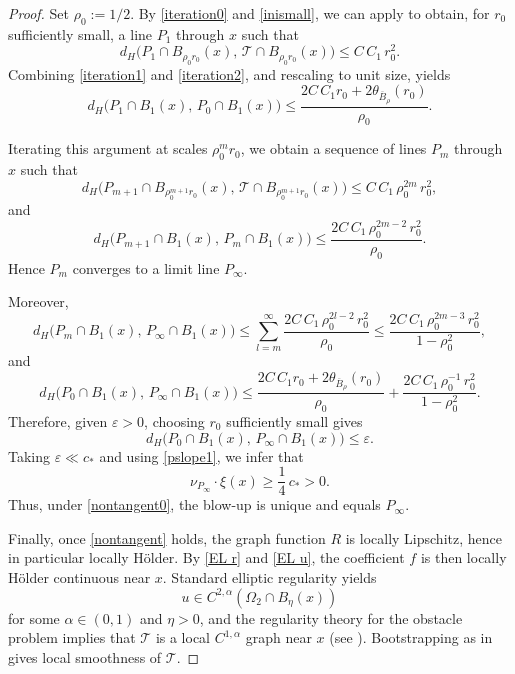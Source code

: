\documentclass[reqno,11pt]{amsart}
\numberwithin{equation}{section}
\theoremstyle{remark}
\begin{document}
\begin{proof}
Set $\rho_0:=1/2$.
By \eqref{iteration0} and \eqref{inismall}, we can apply \cite[Theorem~7.1]{B2001} to obtain,
for $r_0$ sufficiently small, a line $P_1$ through $x$ such that
\begin{equation}\label{iteration2}
d_H\bigl(P_1\cap B_{\rho_0 r_0}(x),\,\mathcal T\cap B_{\rho_0 r_0}(x)\bigr)
\le C\,C_1\,r_0^2.
\end{equation}
Combining \eqref{iteration1} and \eqref{iteration2}, and rescaling to unit size, yields
\[
d_H\bigl(P_1\cap B_1(x),\,P_0\cap B_1(x)\bigr)
\le \frac{2C\,C_1r_0+2\theta_{\overline B_\rho}(r_0)}{\rho_0}.
\]

Iterating this argument at scales $\rho_0^m r_0$, we obtain a sequence of lines $P_m$ through $x$
such that
\[
d_H\bigl(P_{m+1}\cap B_{\rho_0^{m+1}r_0}(x),\,\mathcal T\cap B_{\rho_0^{m+1}r_0}(x)\bigr)
\le C\,C_1\,\rho_0^{2m}\,r_0^2,
\]
and
\[
d_H\bigl(P_{m+1}\cap B_1(x),\,P_m\cap B_1(x)\bigr)
\le \frac{2C\,C_1\,\rho_0^{2m-2}\,r_0^2}{\rho_0}.
\]
Hence $P_m$ converges to a limit line $P_\infty$.

Moreover,
\[
d_H\bigl(P_m\cap B_1(x),\,P_\infty\cap B_1(x)\bigr)
\le
\sum_{l=m}^\infty
\frac{2C\,C_1\,\rho_0^{2l-2}\,r_0^2}{\rho_0}
\le
\frac{2C\,C_1\,\rho_0^{2m-3}\,r_0^2}{1-\rho_0^2},
\]
and
\begin{equation}\label{iterationf}
d_H\bigl(P_0\cap B_1(x),\,P_\infty\cap B_1(x)\bigr)
\le
\frac{2C\,C_1r_0+2\theta_{\overline B_\rho}(r_0)}{\rho_0}
+\frac{2C\,C_1\,\rho_0^{-1}\,r_0^2}{1-\rho_0^2}.
\end{equation}
Therefore, given $\varepsilon>0$, choosing $r_0$ sufficiently small gives
\begin{equation}\label{itfinal}
d_H\bigl(P_0\cap B_1(x),\,P_\infty\cap B_1(x)\bigr)\le \varepsilon.
\end{equation}
Taking $\varepsilon\ll c_\ast$ and using \eqref{pslope1}, we infer that
\begin{equation}\label{nontangent}
\nu_{P_\infty}\cdot\xi(x)\ge \frac14\,c_\ast>0.
\end{equation}
Thus, under \eqref{nontangent0}, the blow-up is unique and equals $P_\infty$.

Finally, once \eqref{nontangent} holds, the graph function $R$ is locally Lipschitz, hence in
particular locally H\"older. By \eqref{EL r} and \eqref{EL u}, the coefficient $f$ is then locally
H\"older continuous near $x$. Standard elliptic regularity yields
\[
u\in C^{2,\alpha}(\Omega_2\cap B_\eta(x))
\]
for some $\alpha\in(0,1)$ and $\eta>0$, and the regularity theory for the obstacle problem
implies that $\mathcal T$ is a local $C^{1,\alpha}$ graph near $x$
(see \cite{C1977,C1998,K1976,KN1977,B2001}).
Bootstrapping as in \cite[Proposition~7.6]{MRZ20252} gives local smoothness of $\mathcal T$.
\end{proof}
\end{document}
